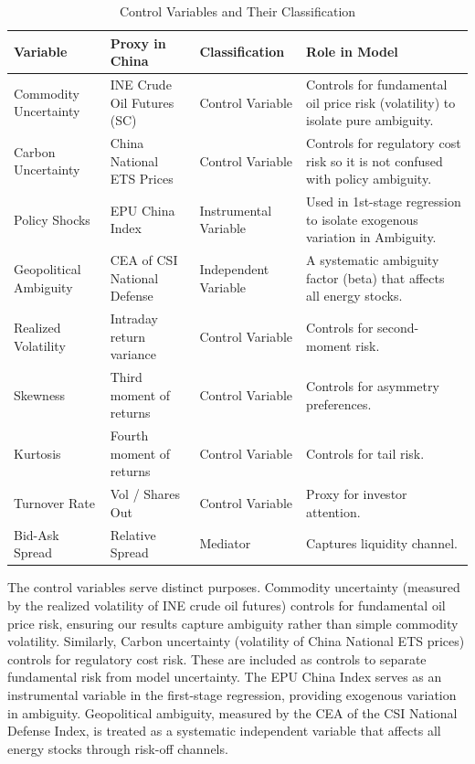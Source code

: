 \documentclass[preprint,12pt,authoryear]{elsarticle}
\begin{document}
\begin{table}[H]
\centering
\caption{Control Variables and Their Classification}
\begin{tabularx}{\textwidth}{>{\raggedright\arraybackslash}p{2cm} >{\raggedright\arraybackslash}p{2cm} >{\raggedright\arraybackslash}p{2cm} X}
\toprule
\textbf{Variable} & \textbf{Proxy in China} & \textbf{Classification} & \textbf{Role in Model} \\
\midrule
Commodity Uncertainty & INE Crude Oil Futures (SC) & Control Variable & Controls for fundamental oil price risk (volatility) to isolate pure ambiguity. \\
Carbon Uncertainty & China National ETS Prices & Control Variable & Controls for regulatory cost risk so it is not confused with policy ambiguity. \\
Policy Shocks & EPU China Index & Instrumental Variable & Used in 1st-stage regression to isolate exogenous variation in Ambiguity. \\
Geopolitical Ambiguity & CEA of CSI National Defense & Independent Variable & A systematic ambiguity factor (beta) that affects all energy stocks. \\
Realized Volatility & Intraday return variance & Control Variable & Controls for second-moment risk. \\
Skewness & Third moment of returns & Control Variable & Controls for asymmetry preferences. \\
Kurtosis & Fourth moment of returns & Control Variable & Controls for tail risk. \\
Turnover Rate & Vol / Shares Out & Control Variable & Proxy for investor attention. \\
Bid-Ask Spread & Relative Spread & Mediator & Captures liquidity channel. \\
\bottomrule
\end{tabularx}
\label{tab:controls}
\end{table}

The control variables serve distinct purposes. Commodity uncertainty (measured by the realized volatility of INE crude oil futures) controls for fundamental oil price risk, ensuring our results capture ambiguity rather than simple commodity volatility. Similarly, Carbon uncertainty (volatility of China National ETS prices) controls for regulatory cost risk. These are included as controls to separate fundamental risk from model uncertainty. The EPU China Index serves as an instrumental variable in the first-stage regression, providing exogenous variation in ambiguity. Geopolitical ambiguity, measured by the CEA of the CSI National Defense Index, is treated as a systematic independent variable that affects all energy stocks through risk-off channels.
\end{document}
